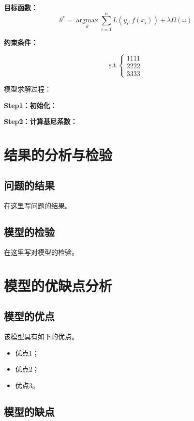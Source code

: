 \documentclass[withoutpreface,bwprint]{cumcmthesis}
\begin{document}
\textbf{目标函数：}
\begin{equation}
    \theta^{\ast}=\mathop{\arg\max}\limits_{\theta} \sum _{i=1}^{n} L\left(y_i,f(x_i)\right)+\lambda \Omega (\omega)
\end{equation}

\textbf{约束条件：}

\begin{equation}
    \text{s.t.}\begin{cases}
        1111\\
        2222\\
        3333
    \end{cases}
\end{equation}

模型求解过程：

\textbf{Step1：初始化：}

\textbf{Step2：计算基尼系数：}



\section{结果的分析与检验}

\subsection{问题的结果}

在这里写问题的结果。

\subsection{模型的检验}

在这里写对模型的检验。

\section{模型的优缺点分析}

\subsection{模型的优点}

该模型具有如下的优点。
\begin{itemize}
    \item 优点1；
    \item 优点2；
    \item 优点3。
\end{itemize}

\subsection{模型的缺点}
\end{document}
